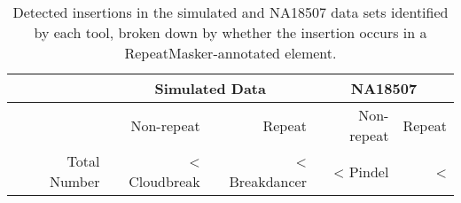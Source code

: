 \begin{table}[b]
\begin{center}
\begin{tabular}{rrr|rr}
 & \multicolumn{2}{c}{Simulated Data} & \multicolumn{2}{c}{NA18507} \\
\hline
 &  Non-repeat & Repeat  &  Non-repeat & Repeat \\ 
 Total Number & <%
  \hline
  Cloudbreak  & <%
  Breakdancer & <%
  Pindel      & <%
   \hline
\end{tabular}
\end{center}
\caption{Detected insertions in the simulated and NA18507 data sets identified by each tool, broken down by whether the insertion occurs in a RepeatMasker-annotated element.}
\label{insertionRepmaskpreds}
\end{table}
